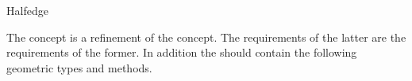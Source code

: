 
\ccRefPageBegin


\begin{ccRefConcept}{Halfedge}

The \ccRefName concept is a refinement of the  concept. 
The requirements of the latter are the requirements of the former.
In addition the \ccRefName should contain the  following geometric types and methods.

\ccTypes
{}

  \ccOperations
  

\end{ccRefConcept} %

\ccRefPageEnd
